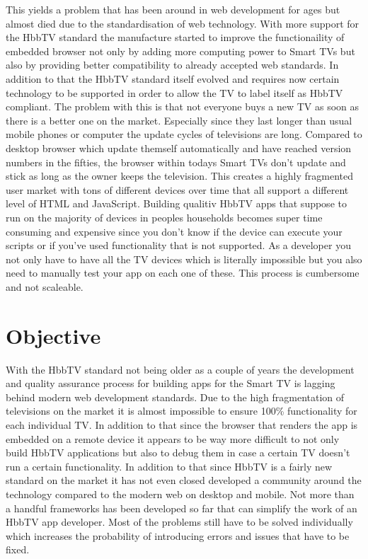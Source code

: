 This yields a problem that has been around in web development for ages but almost died due to the standardisation
of web technology. With more support for the HbbTV standard the manufacture started to improve the functionaility
of embedded browser not only by adding more computing power to Smart TVs but also by providing better compatibility
to already accepted web standards. In addition to that the HbbTV standard itself evolved and requires now certain
technology to be supported in order to allow the TV to label itself as HbbTV compliant. The problem with this is
that not everyone buys a new TV as soon as there is a better one on the market. Especially since they last longer
than usual mobile phones or computer the update cycles of televisions are long. Compared to desktop browser which
update themself automatically and have reached version numbers in the fifties, the browser within todays Smart
TVs don't update and stick as long as the owner keeps the television. This creates a highly fragmented
user market with tons of different devices over time that all support a different level of HTML and JavaScript.
Building qualitiv HbbTV apps that suppose to run on the majority of devices in peoples households becomes super
time consuming and expensive since you don't know if the device can execute your scripts or if you've used
functionality that is not supported. As a developer you not only have to have all the TV devices which is literally
impossible but you also need to manually test your app on each one of these. This process is cumbersome and not
scaleable.

\section{Objective\label{sec:objective}}

With the HbbTV standard not being older as a couple of years the development and quality assurance process for
building apps for the Smart TV is lagging behind modern web development standards. Due to the high fragmentation
of televisions on the market it is almost impossible to ensure 100\% functionality for each individual TV.
In addition to that since the browser that renders the app is embedded on a remote device it appears to be
way more difficult to not only build HbbTV applications but also to debug them in case a certain TV doesn't
run a certain functionality. In addition to that since HbbTV is a fairly new standard on the market it has not
even closed developed a community around the technology compared to the modern web on desktop and mobile. Not
more than a handful frameworks has been developed so far that can simplify the work of an HbbTV app developer. Most
of the problems still have to be solved individually which increases the probability of introducing errors and
issues that have to be fixed.

